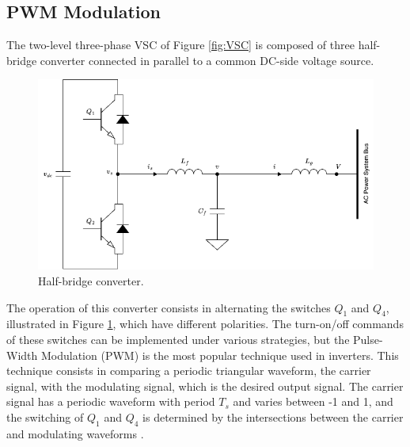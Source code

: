 \subsection{PWM Modulation}\label{subsection:pwm}

The two-level three-phase VSC of Figure \ref{fig:VSC} is composed of three
half-bridge converter connected in parallel to a common DC-side voltage source.

\begin{figure}[ht!]
    \centering
    \includegraphics[width=12cm]{images/half_bridge.png}
    \caption{Half-bridge converter.}
    \label{fig:half_bridge}
\end{figure}

The operation of this converter consists in alternating the switches $Q_1$ and
$Q_4$, illustrated in Figure \ref{fig:half_bridge}, which have different
polarities. The turn-on/off commands of these switches can be implemented under
various strategies, but the Pulse-Width Modulation (PWM) is the most popular
technique used in inverters. This technique consists in comparing a periodic
triangular waveform, the carrier signal, with the modulating signal, which is
the desired output signal. The carrier signal has a periodic waveform with
period $T_s$ and varies between -1 and 1, and the switching of $Q_1$ and $Q_4$
is determined by the intersections between the carrier and modulating waveforms
\cite{yazdani2010voltage}.

